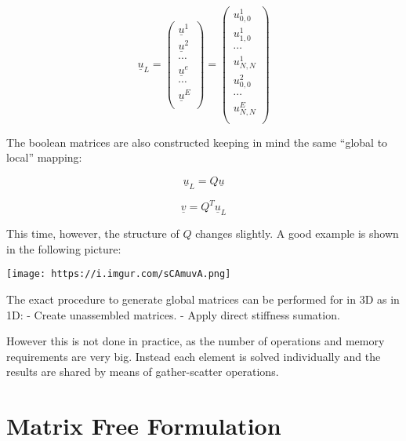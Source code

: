 \documentclass[
]{scrartcl}
\begin{document}
\begin{equation}
    \underline{u}_L=
    \begin{pmatrix}
    \underline{u}^{1} \\
    \underline{u}^{2} \\
    \cdots \\
    \underline{u}^{e} \\
    \cdots \\
    \underline{u}^{E} \\
    \end{pmatrix}= 
    \begin{pmatrix}
    {u}^{1}_{0,0} \\
    {u}^{1}_{1,0} \\
    \cdots \\
    {u}^{1}_{N,N} \\
    {u}^{2}_{0,0} \\
    \cdots \\
    {u}^{E}_{N,N} \\
    \end{pmatrix}
\end{equation}

The boolean matrices are also constructed keeping in mind the same
``global to local'' mapping:

\begin{equation}
    \underline{u}_L=Q\underline{u}
\end{equation}

\begin{equation}
    \underline{v}=Q^{T}\underline{u}_L
\end{equation}

This time, however, the structure of \(Q\) changes slightly. A good
example is shown in the following picture:

\texttt{[image: https://i.imgur.com/sCAmuvA.png]}

The exact procedure to generate global matrices can be performed for in
3D as in 1D: - Create unassembled matrices. - Apply direct stiffness
sumation.

However this is not done in practice, as the number of operations and
memory requirements are very big. Instead each element is solved
individually and the results are shared by means of gather-scatter
operations.

\hypertarget{matrix-free-formulation}{%
\section{Matrix Free Formulation}\label{matrix-free-formulation}}
\end{document}
